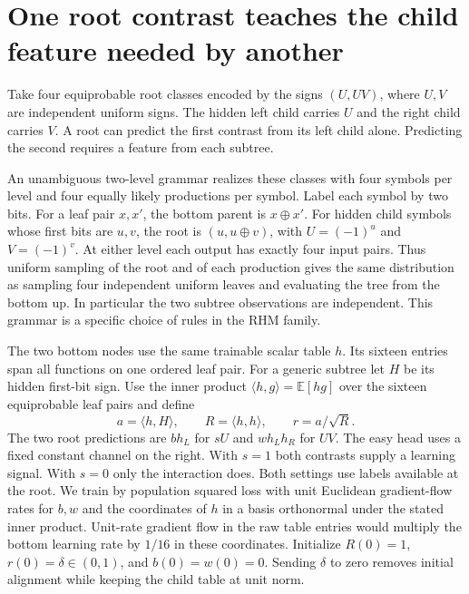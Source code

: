 \section{One root contrast teaches the child feature needed by another}
\label{sec:parity-toy}

Take four equiprobable root classes encoded by the signs $(U,UV)$, where
$U,V$ are independent uniform signs. The hidden left child carries $U$ and the
right child carries $V$. A root can predict the first contrast from its left
child alone. Predicting the second requires a feature from each subtree.

An unambiguous two-level grammar realizes these classes with four symbols
per level and four equally likely productions per symbol. Label each symbol
by two bits. For a leaf pair $x,x'$, the bottom parent is $x\oplus x'$.
For hidden child symbols whose first bits are $u,v$, the root is
$(u,u\oplus v)$, with $U=(-1)^u$ and $V=(-1)^v$. At either level each
output has exactly four input pairs. Thus uniform sampling of the root
and of each production gives the same distribution as sampling four
independent uniform leaves and evaluating the tree from the bottom up.
In particular the two subtree observations are independent. This grammar
is a specific choice of rules in the RHM family.

The two bottom nodes use the same trainable scalar table $h$. Its sixteen
entries span all functions on one ordered leaf pair. For a generic subtree
let $H$ be its hidden first-bit sign. Use the inner product
$\langle h,g\rangle=\mathbb E[hg]$ over the sixteen equiprobable leaf
pairs and define
\[
 a=\langle h,H\rangle,\qquad R=\langle h,h\rangle,\qquad
 r=a/\sqrt R .
\]
The two root predictions are $b h_L$ for $sU$ and $w h_Lh_R$ for $UV$.
The easy head uses a fixed constant channel on the right. With $s=1$
both contrasts supply a learning signal. With $s=0$ only the interaction
does. Both settings use labels available at the root. We train by
population squared loss with unit Euclidean gradient-flow rates for
$b,w$ and the coordinates of $h$ in a basis orthonormal under the stated
inner product. Unit-rate gradient flow in the raw table entries would
multiply the bottom learning rate by $1/16$ in these coordinates.
Initialize $R(0)=1$, $r(0)=\delta\in(0,1)$, and $b(0)=w(0)=0$.
Sending $\delta$ to zero removes initial alignment while keeping the
child table at unit norm.


